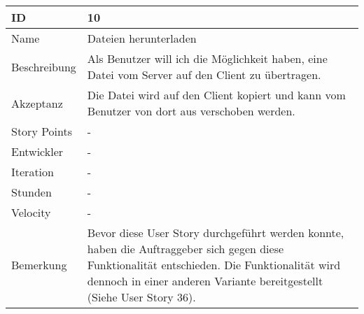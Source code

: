 \begin{table}[htbp]
    \begin{minipage}{\linewidth}
        \setlength{\tymax}{0.5\linewidth}
        \centering
        \small
        \begin{tabulary}{\textwidth}{|l|p{10cm}|} \hline
            ID   &10\\\hline
            Name  &Dateien herunterladen\\\hline
	    Beschreibung&Als Benutzer will ich die Möglichkeit haben, eine Datei vom Server auf den Client zu übertragen.\\\hline
            Akzeptanz &Die Datei wird auf den Client kopiert und kann vom Benutzer von dort aus verschoben werden.\\\hline
            Story Points&-\\\hline
            Entwickler &-\\\hline
            Iteration &-\\\hline
            Stunden  &-\\\hline
            Velocity &-\\\hline
            Bemerkung & Bevor diese User Story durchgeführt werden konnte, haben die Auftraggeber sich gegen diese Funktionalität entschieden. Die Funktionalität wird dennoch in einer anderen Variante bereitgestellt (Siehe User Story 36). \\\hline
        \end{tabulary}
    \end{minipage}
\end{table}



